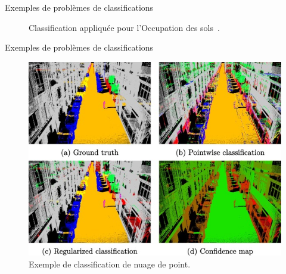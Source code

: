 \documentclass[8pt]{beamer}
\begin{document}
		\begin{frame}{Exemples de problèmes de classifications}
			\begin{figure}[H]
				{
					\caption*{\tiny Classification appliquée pour l'Occupation des sols~\cite{postadjian2017investigating}.}
				}
			\end{figure}
		\end{frame}

		\begin{frame}{Exemples de problèmes de classifications}
			\begin{figure}[H]
				\includegraphics[width=.6\textwidth]{images/samples/pc_classification}
				\caption*{\tiny Exemple de classification de nuage de point\cite{landrieu2017structured}.}
			\end{figure}
		\end{frame}
\end{document}
